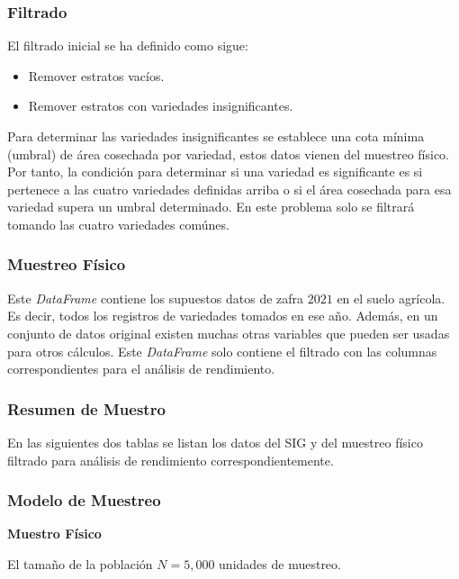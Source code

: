 \subsubsection{Filtrado}

El filtrado inicial se ha definido como sigue:

\begin{itemize}
    \item Remover estratos vacíos.
    \item Remover estratos con variedades insignificantes.
\end{itemize}

Para determinar las variedades insignificantes se establece una cota mínima (umbral) de área cosechada por variedad, estos datos vienen del muestreo físico. Por tanto, la condición para determinar si una variedad es significante es si pertenece a las cuatro variedades definidas arriba o si el área cosechada para esa variedad supera un umbral determinado. En este problema solo se filtrará tomando las cuatro variedades comúnes.

\subsubsection{Muestreo Físico}

Este \textit{DataFrame} contiene los supuestos datos de zafra $2021$ en el suelo agrícola. Es decir, todos los registros de variedades tomados en ese año. Además, en un conjunto de datos original existen muchas otras variables que pueden ser usadas para otros cálculos. Este \textit{DataFrame} solo contiene el filtrado con las columnas correspondientes para el análisis de rendimiento.

\subsubsection{Resumen de Muestro}

En las siguientes dos tablas se listan los datos del SIG y del muestreo físico filtrado para análisis de rendimiento correspondientemente.

\subsubsection{Modelo de Muestreo}

\textbf{Muestro Físico}

\bigbreak

El tamaño de la población $N = 5,000$ unidades de muestreo.

